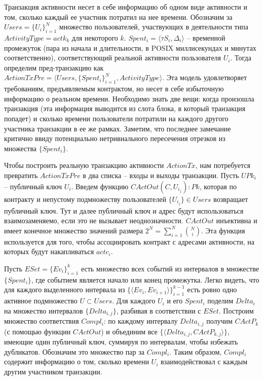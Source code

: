 \documentclass[specification,annotation]{itmo-student-thesis}
\begin{document}
Транзакция активности несет в себе информацию об одном виде активности
и том, сколько каждый ее участник потратил на нее времени. Обозначим
за $Users = \{U_i\}_{i=1}^N$ множество пользователей, участвующих в
деятельности типа $ActivityType = actk_k$ для некоторого $k$. $Spent_i
= \langle \tau S_i, \Delta_i \rangle$ -- временной промежуток (пара из
начала и длительности, в POSIX миллисекундах и минутах
соответственно), соответствующий реальной активности пользователя
$U_i$. Тогда определим пред-транзакцию как $ActionTxPre = \langle
Users, \{Spent_i\}_{i=1}^N, ActivityType \rangle$. Эта модель
удовлетворяет требованиям, предъявляемым контрактом, но несет в себе
избыточную информацию о реальном времени. Необходимо знать две вещи:
когда произошла транзакция (эта информация выводится из слота блока, в
который транзакция попадет) и сколько времени пользователи потратили
на каждого другого участника транзакции в ее же рамках. Заметим, что
последнее замечание критично ввиду потенциально нетривиального
пересечения отрезков из множества $\{Spent_i\}$.

Чтобы построить реальную транзакцию активности $ActionTx$, нам
потребуется превратить $ActionTxPre$ в два списка -- входы и выходы
транзакции. Пусть $UPk_i$ -- публичный ключ $U_i$. Введем функцию
$CActOut(C, {U_{i_j}}) : Pk$, которая по контракту и непустому
подмножеству пользователей $\{U_{i_j}\} \in Users$ возвращает
публичный ключ. Тут и далее публичный ключ и адрес будут
использоваться взаимозаменяемо, если это не вызывает
неоднозначности. $CActOut$ инъективна и имеет конечное множество
значений размера $2^N = \sum_{i=1}^N{\binom{N}{i}}$. Эта функция
используется для того, чтобы ассоциировать контракт с адресами
активности, на которых будут накапливаться $actc_i$.

Пусть $ESet = \{Ev_i\}_{i=1}^k$ есть множество всех событий из
интервалов в множестве $\{Spent_i\}$, где событием является начало или
конец промежутка. Легко видеть, что для каждого выделенного интервала
из $\{\langle Ev_i, Ev_{i+1} \rangle\}_{i=1}^{k-1}$ есть ровно одно
активное подмножество $U \subset Users$. Для каждого $U_i$ и его
$Spent_i$ поделим $Delta_i$ на множество интервалов $\{Delta_{i,j}\}$,
разбивая в соответствии с $ESet$. Построим множество соответствия
$Compl_i$: по каждому интервалу $Delta_{i,j}$ получим $CActP_k$ (с
помощью функции $CActOut$) и объединим все $\{\langle Delta_{i,j},
CActP_{k,j}\rangle\}$, имеющие один публичный ключ, суммируя по
интервалам, чтобы избежать дубликатов. Обозначим это множество пар за
$Compl_i$. Таким образом, $Compl_i$ содержит информацию о том, сколько
времени $U_i$ взаимодействовал с каждым другим участником транзакции.
\end{document}
